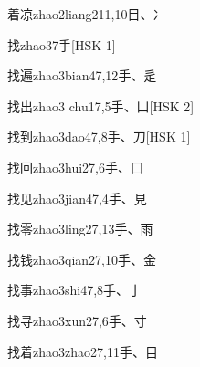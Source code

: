 \begin{entry}{着凉}{zhao2liang2}{11,10}{⽬、⼎}
\end{entry}

\begin{entry}{找}{zhao3}{7}{⼿}[HSK 1]
\end{entry}

\begin{entry}{找遍}{zhao3bian4}{7,12}{⼿、⾡}
\end{entry}

\begin{entry}{找出}{zhao3 chu1}{7,5}{⼿、⼐}[HSK 2]
\end{entry}

\begin{entry}{找到}{zhao3dao4}{7,8}{⼿、⼑}[HSK 1]
\end{entry}

\begin{entry}{找回}{zhao3hui2}{7,6}{⼿、⼞}
\end{entry}

\begin{entry}{找见}{zhao3jian4}{7,4}{⼿、⾒}
\end{entry}

\begin{entry}{找零}{zhao3ling2}{7,13}{⼿、⾬}
\end{entry}

\begin{entry}{找钱}{zhao3qian2}{7,10}{⼿、⾦}
\end{entry}

\begin{entry}{找事}{zhao3shi4}{7,8}{⼿、⼅}
\end{entry}

\begin{entry}{找寻}{zhao3xun2}{7,6}{⼿、⼨}
\end{entry}

\begin{entry}{找着}{zhao3zhao2}{7,11}{⼿、⽬}
\end{entry}

